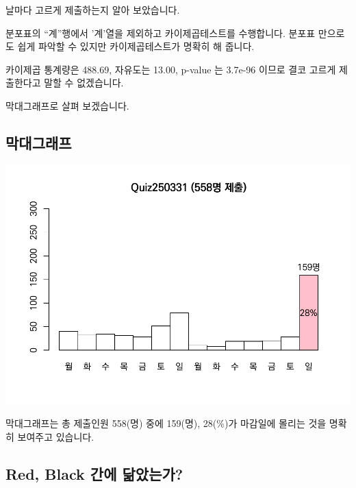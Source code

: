 \documentclass[
]{book}
\begin{document}
날마다 고르게 제출하는지 알아 보았습니다.

분포표의 ``계''행에서 '계'열을 제외하고 카이제곱테스트를 수행합니다. 분포표 만으로도 쉽게 파악할 수 있지만 카이제곱테스트가 명확히 해 줍니다.

카이제곱 통계량은 488.69, 자유도는 13.00, p-value 는 3.7e-96 이므로 결코 고르게 제출한다고 말할 수 없겠습니다.

막대그래프로 살펴 보겠습니다.

\subsection{막대그래프}\label{uxb9c9uxb300uxadf8uxb798uxd504-5}

\includegraphics{_main_files/figure-latex/unnamed-chunk-131-1.pdf}

막대그래프는 총 제출인원 558(명) 중에 159(명), 28(\%)가 마감일에 몰리는 것을 명확히 보여주고 있습니다.

\subsection{Red, Black 간에 닮았는가?}\label{red-black-uxac04uxc5d0-uxb2eeuxc558uxb294uxac00-4}
\end{document}
